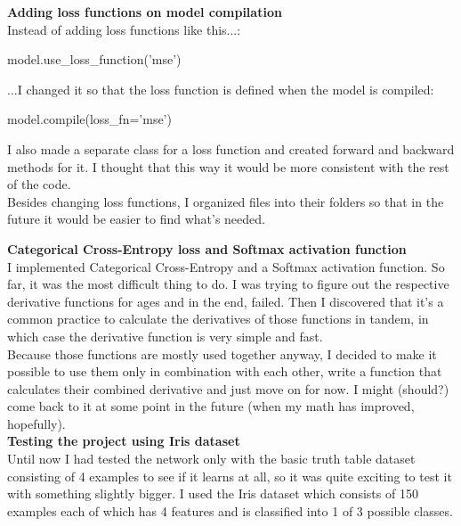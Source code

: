 \documentclass{article}
\begin{document}
\textbf{Adding loss functions on model compilation} \\

Instead of adding loss functions like this...:
\begin{python}
model.use_loss_function('mse')
\end{python}

...I changed it so that the loss function is defined when the model is compiled:
\begin{python}
model.compile(loss_fn='mse')
\end{python}

I also made a separate class for a loss function and created forward and backward methods for it. I thought 
that this way it would be more consistent with the rest of the code. \\

Besides changing loss functions, I organized files into their folders so that in the future it would be easier
to find what's needed.

\textbf{Categorical Cross-Entropy loss and Softmax activation function} \\

I implemented Categorical Cross-Entropy and a Softmax activation function. So far, it was the 
most difficult thing to do. I was trying to figure out the respective derivative functions for ages 
and in the end, failed. Then I discovered that it's a common practice to calculate the derivatives of 
those functions in tandem, in which case the derivative function is very simple and fast. \\

Because those functions are mostly used together anyway, I decided to make it possible to use them 
only in combination with each other, write a function that calculates their combined derivative and 
just move on for now. I might (should?) come back to it at some point in the future (when my math 
has improved, hopefully). \\

\textbf{Testing the project using Iris dataset} \\

Until now I had tested the network only with the basic truth table dataset consisting of 4 examples
to see if it learns at all, so it was quite exciting to test it with something slightly bigger. I used 
the Iris dataset which consists of 150 examples each of which has 4 features and is classified 
into 1 of 3 possible classes. \\
\end{document}
